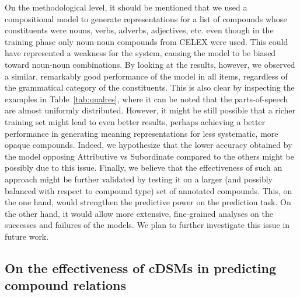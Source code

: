 \documentclass[output=paper]{langsci/langscibook}
\begin{document}
On the methodological level, it should be mentioned that we used a compositional model to generate representations for a list of compounds whose constituents were nouns, verbs, adverbs, adjectives, etc. even though in the training phase only noun-noun compounds from CELEX were used. This could have represented a weakness for the system, causing the model to be biased toward noun-noun combinations. By looking at the results, however, we observed a similar, remarkably good performance of the model in all items, regardless of the grammatical category of the constituents. This is also clear by inspecting the examples in Table~\ref{tab:qualres}, where it can be noted that the parts-of-speech are almost uniformly distributed. However, it might be still possible that a richer training set might lead to even better results, perhaps achieving a better performance in generating meaning representations for less systematic, more opaque compounds. Indeed, we hypothesize that the lower accuracy obtained by the model opposing Attributive vs Subordinate compared to the others might be possibly due to this issue. Finally, we believe that the effectiveness of such an approach might be further validated by testing it on a larger (and possibly balanced with respect to compound type) set of annotated compounds. This, on the one hand, would strengthen the predictive power on the prediction task. On the other hand, it would allow more extensive, fine-grained analyses on the successes and failures of the models. We plan to further investigate this issue in future work.


\subsection{On the effectiveness of cDSMs in predicting compound relations}
\end{document}
